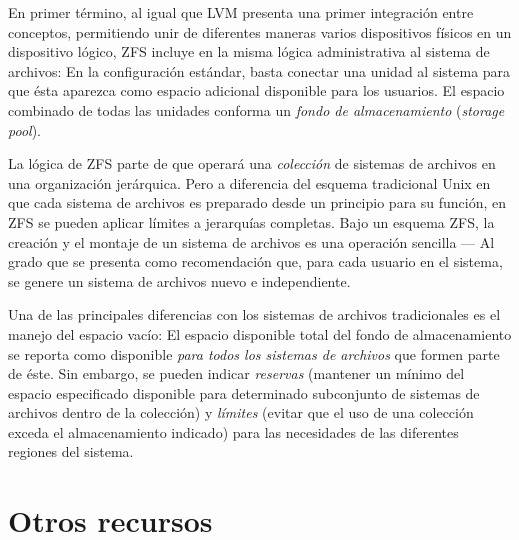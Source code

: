 \documentclass[11pt,fleqn]{book} %
\begin{document}
En primer término, al igual que LVM presenta una primer integración
entre conceptos, permitiendo unir de diferentes maneras varios
dispositivos físicos en un dispositivo lógico, ZFS incluye en la misma
lógica administrativa al sistema de archivos: En la configuración
estándar, basta conectar una unidad al sistema para que ésta aparezca
como espacio adicional disponible para los usuarios. El espacio
combinado de todas las unidades conforma un \emph{fondo de almacenamiento}
(\emph{storage pool}).

La lógica de ZFS parte de que operará una \emph{colección} de sistemas de
archivos en una organización jerárquica. Pero a diferencia del esquema
tradicional Unix en que cada sistema de archivos es preparado desde un
principio para su función, en ZFS se pueden aplicar límites a
jerarquías completas. Bajo un esquema ZFS, la creación y el montaje de
un sistema de archivos es una operación sencilla — Al grado que se
presenta como recomendación que, para cada usuario en el sistema, se
genere un sistema de archivos nuevo e independiente.

Una de las principales diferencias con los sistemas de archivos
tradicionales es el manejo del espacio vacío: El espacio disponible
total del fondo de almacenamiento se reporta como disponible \emph{para todos los sistemas de archivos} que formen parte de éste. Sin embargo,
se pueden indicar \emph{reservas} (mantener un mínimo del espacio
especificado disponible para determinado subconjunto de sistemas de
archivos dentro de la colección) y \emph{límites} (evitar que el uso de una
colección exceda el almacenamiento indicado) para las necesidades de
las diferentes regiones del sistema.
\section{Otros recursos}
\label{sec-10-4}
\end{document}
